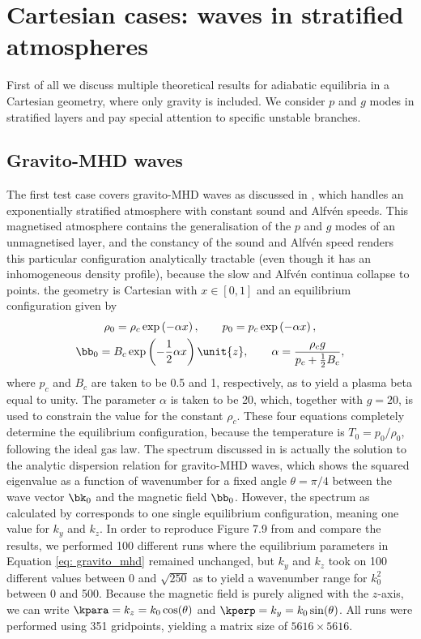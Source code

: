 \section{Cartesian cases: waves in stratified atmospheres}
First of all we discuss multiple theoretical results for adiabatic equilibria in a Cartesian geometry, where only gravity is included. We consider $p$ and $g$ modes in stratified layers and pay special attention to specific unstable branches.

\subsection{Gravito-MHD waves} \label{ss: gravito-mhd}
The first test case covers gravito-MHD waves as discussed in \citet[Figure 7.9]{book_MHD}, which handles an exponentially stratified atmosphere with constant sound and Alfv\'en speeds. This magnetised atmosphere contains the generalisation of the $p$ and $g$ modes of an unmagnetised layer, and the constancy of the sound and Alfv\'en speed renders this particular configuration analytically tractable (even though it has an inhomogeneous density profile), because the slow and Alfv\'en continua collapse to points. the geometry is Cartesian with $x \in [0, 1]$ and an equilibrium configuration given by
\begin{equation} \label{eq: gravito_mhd}
  \begin{gathered}
    \rho_0 = \rho_c \exp\left(-\alpha x\right), \qquad p_0 = p_c \exp\left(-\alpha x\right), \\
    \bb_0 = B_c \exp\left(-\frac{1}{2}\alpha x\right)\unit{z}, \qquad \alpha = \frac{\rho_c g}{p_c + \frac{1}{2}B_c},
  \end{gathered}
\end{equation}
where $p_c$ and $B_c$ are taken to be 0.5 and 1, respectively, as to yield a plasma beta equal to unity. The parameter $\alpha$ is taken to be 20, which, together with $g = 20$, is used to constrain the value for the constant $\rho_c$. These four equations completely determine the equilibrium configuration, because the temperature is $T_0 = p_0/\rho_0$, following the ideal gas law. The spectrum discussed in \citet{book_MHD} is actually the solution to the analytic dispersion relation for gravito-MHD waves, which shows the squared eigenvalue as a function of wavenumber for a fixed angle $\theta = \pi / 4$ between the wave vector $\bk_0$ and the magnetic field $\bb_0$. However, the spectrum as calculated by {\legolas} corresponds to one single equilibrium configuration, meaning one value for $k_y$ and $k_z$. In order to reproduce Figure 7.9 from \citet{book_MHD} and compare the results, we performed 100 different runs where the equilibrium parameters in Equation \eqref{eq: gravito_mhd} remained unchanged, but $k_y$ and $k_z$ took on 100 different values between $0$ and $\sqrt{250}$ as to yield a wavenumber range for $k_0^2$ between 0 and 500. Because the magnetic field is purely aligned with the $z$-axis, we can write $\kpara = k_z = k_0\cos(\theta)$ and $\kperp = k_y = k_0\sin(\theta)$. All runs were performed using 351 gridpoints, yielding a matrix size of $5616 \times 5616$.

